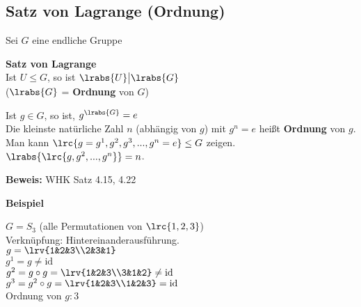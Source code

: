 	\subsection{Satz von Lagrange (Ordnung)}

	Sei $G$ eine endliche Gruppe
		\item \textbf{Satz von Lagrange}\\
		Ist $U\leq G$, so ist $\lrabs{U}\big|\lrabs{G}$\\
		($\lrabs{G}$ = \textbf{Ordnung} von $G$)

		\item Ist $g\in G$, so ist, $g^{\lrabs{G}}=e$\\
		Die kleinste natürliche Zahl $n$ (abhängig von $g$) mit $g^n=e$ heißt \textbf{Ordnung} von $g$.\\
		Man kann $\lrc{g=g^1,g^2,g^3,...,g^n=e}\leq G$ zeigen.\\
		$\lrabs{\lrc{g,g^2,...,g^n}}=n$.

		\textbf{Beweis:} WHK Satz 4.15, 4.22

		\textbf{Beispiel}

		$G=S_3$ (alle Permutationen von $\lrc{1,2,3}$)\\
		Verknüpfung: Hintereinanderausführung.\\
		$g=\lrv{1&2&3\\2&3&1}$ \\
		$g^1 = g \neq\mbox{id}$ \\
		$g^2 = g\circ g =\lrv{1&2&3\\3&1&2}\neq\mbox{id}$\\
		$g^3 = g^2\circ g =\lrv{1&2&3\\1&2&3}=\mbox{id}$\\
		Ordnung von $g: 3$
	\subExEnd
